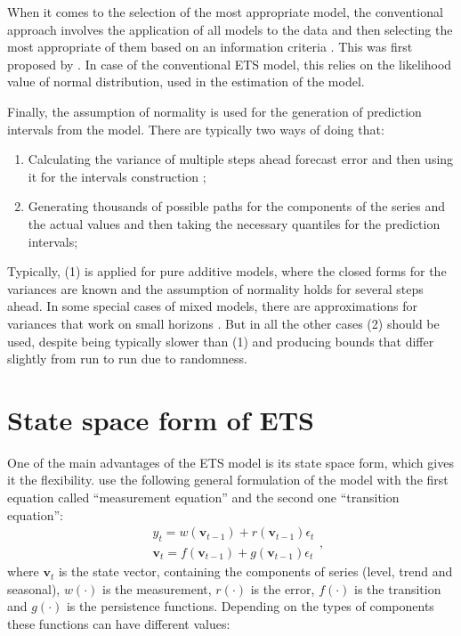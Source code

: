 \documentclass[
]{book}
\providecommand{\tightlist}{%
  \setlength{\itemsep}{0pt}\setlength{\parskip}{0pt}}
\theoremstyle{definition}
\theoremstyle{definition}
\theoremstyle{definition}
\theoremstyle{definition}
\theoremstyle{remark}
\begin{document}
When it comes to the selection of the most appropriate model, the conventional approach involves the application of all models to the data and then selecting the most appropriate of them based on an information criteria \citep[see Section 13.4 of][]{SvetunkovSBA}. This was first proposed by \citet{Hyndman2002}. In case of the conventional ETS model, this relies on the likelihood value of normal distribution, used in the estimation of the model.

Finally, the assumption of normality is used for the generation of prediction intervals from the model. There are typically two ways of doing that:

\begin{enumerate}
\def\labelenumi{\arabic{enumi}.}
\tightlist
\item
  Calculating the variance of multiple steps ahead forecast error and then using it for the intervals construction \citep[see Chapter 6 of][]{Hyndman2008b};
\item
  Generating thousands of possible paths for the components of the series and the actual values and then taking the necessary quantiles for the prediction intervals;
\end{enumerate}

Typically, (1) is applied for pure additive models, where the closed forms for the variances are known and the assumption of normality holds for several steps ahead. In some special cases of mixed models, there are approximations for variances that work on small horizons \citep[see Section 6.4 of][]{Hyndman2008b}. But in all the other cases (2) should be used, despite being typically slower than (1) and producing bounds that differ slightly from run to run due to randomness.

\hypertarget{ETSConventionalModel}{%
\section{State space form of ETS}\label{ETSConventionalModel}}

One of the main advantages of the ETS model is its state space form, which gives it the flexibility. \citet{Hyndman2008b} use the following general formulation of the model with the first equation called ``measurement equation'' and the second one ``transition equation'':
\begin{equation}
  \begin{aligned}
  & {y}_{t} = w(\mathbf{v}_{t-1}) + r(\mathbf{v}_{t-1}) \epsilon_t \\
  & \mathbf{v}_{t} = f(\mathbf{v}_{t-1}) + g(\mathbf{v}_{t-1}) \epsilon_t
  \end{aligned},
  \label{eq:ETSConventionalStateSpace}
\end{equation}
where \(\mathbf{v}_t\) is the state vector, containing the components of series (level, trend and seasonal), \(w(\cdot)\) is the measurement, \(r(\cdot)\) is the error, \(f(\cdot)\) is the transition and \(g(\cdot)\) is the persistence functions. Depending on the types of components these functions can have different values:
\end{document}
